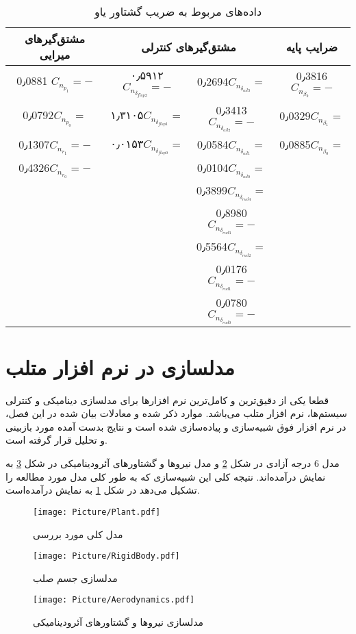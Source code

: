 \begin{table}
\centering%
\caption{داده‌های مربوط به ضریب گشتاور یاو}\label{داده‌های مربوط به ضریب گشتاور یاو}
\begin{tabular}{ |c|c|c|c| }
  \hline
  مشتق‌گیرهای میرایی & \multicolumn{2}{|c|}{مشتق‌گیرهای کنترلی} & ضرایب پایه \\ \hline
 0٫0881 $C_{n_{p_{1}}}=-$& ۰٫۵۹۱۲$C_{n_{\delta_{flap2}}}=-$ & 0٫2694$C_{n_{\delta_{ail3}}}=$ & 0٫3816$C_{n_{\beta_{2}}}= -$\\
  \hline
 0٫0792$C_{n_{p_{0}}}=$& ۱٫۳۱۰۵$C_{n_{\delta_{flap1}}}=$ & 0٫3413$C_{n_{\delta_{ail2}}}=-$& 0٫0329$C_{n_{\beta_{1}}}=$\\
  \hline
0٫1307$C_{n_{r_{1}}}=-$& ۰٫۰۱۵۳$ C_{n_{\delta_{flap0}}}=$ & 0٫0584$C_{n_{\delta_{ail1}}}=$ & 0٫0885$C_{n_{\beta_{0}}}= $\\
  \hline
 0٫4326$C_{n_{r_{0}}}=-$&& 0٫0104$ C_{n_{\delta_{ail0}}}=$ & \\
 \hline
  && 0٫3899$ C_{n_{\delta_{rud4}}}=$ & \\
   \hline
 && 0٫8980$C_{n_{\delta_{rud3}}}=-$ &\\
   \hline
 && 0٫5564$ C_{n_{\delta_{rud2}}}=$ & \\
   \hline
 && 0٫0176$C_{n_{\delta_{rud1}}}=- $ & \\
 \hline
 && 0٫0780$C_{n_{\delta_{rud0}}}=- $ & \\
 \hline
 \end{tabular}
\end{table}
\section{مدلسازی در نرم افزار متلب}
قطعا یکی از دقیق‌ترین و کامل‌ترین نرم افزارها برای مدلسازی دینامیکی و کنترلی سیستم‌ها، نرم افزار متلب
می‌باشد.
موارد ذکر شده و معادلات بیان شده در این فصل،‌ در نرم افزار فوق شبیه‌سازی و پیاده‌سازی شده است و نتایج بدست آمده مورد بازبینی و تحلیل قرار گرفته است.

مدل 6 درجه آزادی در شکل \ref{pic:RigidBody} و مدل نیروها و گشتاورهای آئرودینامیکی در شکل \ref{pic:Aerodynamics} به نمایش درآمده‌اند.
نتیجه کلی این شبیه‌سازی که به طور کلی مدل مورد مطالعه را تشکیل می‌دهد در شکل \ref{pic:Plant} به نمایش درآمده‌است.
	 	\begin{figure}[h]
	 		\center
	 		\texttt{[image: Picture/Plant.pdf]}
	 		\caption{مدل کلی مورد بررسی} \label{pic:Plant}
	 	\end{figure}
 \begin{figure}[b]
 	\center
 	\texttt{[image: Picture/RigidBody.pdf]}
 	\caption{مدلسازی جسم صلب} \label{pic:RigidBody}
 	\end{figure}
 	\begin{figure}[b]
 		\center
 		\texttt{[image: Picture/Aerodynamics.pdf]}
 		\caption{مدلسازی نیروها و گشتاورهای آئرودینامیکی} \label{pic:Aerodynamics}
 	\end{figure}